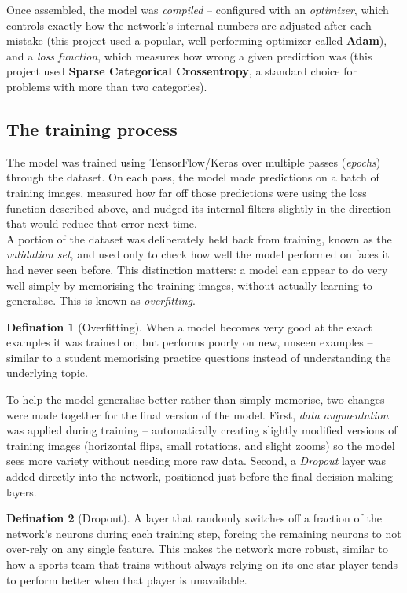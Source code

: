 \documentclass[11 pt , a 4 paper ]{article}
\theoremstyle{definition}
\newtheorem{thm}{Defination}
\begin{document}
\noindent Once assembled, the model was \emph{compiled} -- configured with an \emph{optimizer}, which controls exactly how the network's internal numbers are adjusted after each mistake (this project used a popular, well-performing optimizer called \textbf{Adam}), and a \emph{loss function}, which measures how wrong a given prediction was (this project used \textbf{Sparse Categorical Crossentropy}, a standard choice for problems with more than two categories).
 
\subsection{The training process}
The model was trained using TensorFlow/Keras over multiple passes (\emph{epochs}) through the dataset. On each pass, the model made predictions on a batch of training images, measured how far off those predictions were using the loss function described above, and nudged its internal filters slightly in the direction that would reduce that error next time.\\
 
\noindent A portion of the dataset was deliberately held back from training, known as the \emph{validation set}, and used only to check how well the model performed on faces it had never seen before. This distinction matters: a model can appear to do very well simply by memorising the training images, without actually learning to generalise. This is known as \emph{overfitting}.
 
\begin{thm}[Overfitting]
When a model becomes very good at the exact examples it was trained on, but performs poorly on new, unseen examples -- similar to a student memorising practice questions instead of understanding the underlying topic.
\end{thm}
 
\noindent To help the model generalise better rather than simply memorise, two changes were made together for the final version of the model. First, \emph{data augmentation} was applied during training -- automatically creating slightly modified versions of training images (horizontal flips, small rotations, and slight zooms) so the model sees more variety without needing more raw data. Second, a \emph{Dropout} layer was added directly into the network, positioned just before the final decision-making layers.
 
\begin{thm}[Dropout]
A layer that randomly switches off a fraction of the network's neurons during each training step, forcing the remaining neurons to not over-rely on any single feature. This makes the network more robust, similar to how a sports team that trains without always relying on its one star player tends to perform better when that player is unavailable.
\end{thm}
 
\end{document}
